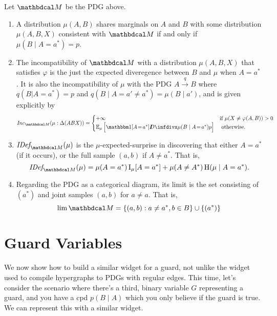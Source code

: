 \documentclass{article}
\begin{document}
		\begin{prop}
			\label{prop:sem1}
		Let $\dg M$ be the PDG above.
		\begin{enumerate}
			\item
				A distribution $\mu(A,B)$ shares marginals on $A$ and $B$ with some distribution $\mu(A,B,X)$ consistent with $\dg M$ if and only if $\mu(B \mid A = a^*) = p$.
			\item The incompatibility of $\dg M$ with a distribution $\mu(A,B,X)$ that satisfies $\varphi$ is the just the expected diveregence between $B$ and $\mu$ when $A = a^*$. It is also the incompatibility of $\mu$ with the PDG $A \xrightarrow{q} B$ where $q(B|A = a^*) = p$ and $q(B \mid A = a'\ne a^*) = \mu(B\mid a')$, and is given explicitly by
				\[ \Inc_{\dg M}(\mu:\Delta(ABX)) = \begin{cases}
					+\infty& \text{if~}\mu(X \ne \varphi(A,B)) >0 \\
					\Ex_\mu \Big[ \mathbbm1[{A\!=\!a^*}]  \kldiv{\mu(B\mid A\!=\!a^*)}{p} \Big] & \text{~otherwise.}
				\end{cases} \]

			\item $\IDef{\dg M}(\mu)$ is the $\mu$-expected-surprise in discovering that either $A= a^*$ (if it occurs), or the full sample $(a,b)$ if $A \ne a^*$. That is,
				\[ \IDef{\dg M}(\mu) =  \mu(A = a^*) \I_\mu[A = a^*] + \mu(A \ne A^*) \H(\mu \mid A = a^*). \]

			\item Regarding the PDG as a categorical diagram, its limit is the set consisting of $(a^*)$ and joint samples $(a,b)$ for $a \ne a$.  That is,
			\[ \lim \dg M = \{(a,b) : a \ne a^*, b \in B\} \cup \{ (a^*) \} \]
		\end{enumerate}
	\end{prop}
	\medskip
	\clearpage
	\section{Guard Variables}

	We now show how to build a similar widget for a guard, not unlike the widget used to compile hypergraphs to PDGs with regular edges. This time, let's consider the scenario where there's a third, binary variable $G$ representing a guard, and you have a cpd $p(B \mid A) $ which you only believe if the guard is true. We can represent this with a similar widget.
\end{document}
